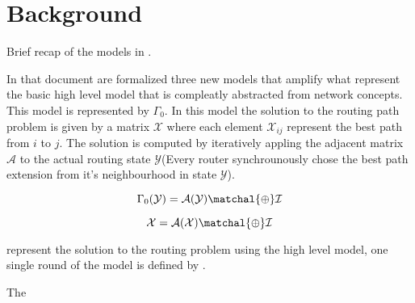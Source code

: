 \documentclass[10pt,conference,letterpaper]{IEEEtran}
\theoremstyle{definition}
\theoremstyle{remark}
\newcommand{\semiringchoice}{\ensuremath{\matchal{\oplus}}\xspace}
\newcommand{\Amatrix}{\ensuremath{\mathcal{A}}\xspace}
\newcommand{\highlevelmodel}{\ensuremath{\Gamma_0}\xspace}
\newcommand{\resultmatrix}{\ensuremath{\mathcal{X}}\xspace}
\newcommand{\currentstatematrix}{\ensuremath{\mathcal{Y}}\xspace}
\newcommand{\Imatrix}{\ensuremath{\mathcal{I}}\xspace}
\begin{document}
\section{Background}
\label{sec:background}

Brief recap of the models in \cite{AgdaHardStateVectoringRouting}.

In that document are formalized three new models that amplify what represent the
basic high level model that is compleatly abstracted from network concepts.
This model is represented by \highlevelmodel.
In this model the solution to the routing path problem is given by a matrix \resultmatrix
where each element $\resultmatrix_{ij}$ represent the best path from $i$ to $j$.
The solution is computed by iteratively appling the adjacent matrix \Amatrix to
the actual routing state \currentstatematrix (Every router synchrounously chose
the best path extension from it's neighbourhood in state \currentstatematrix).

\begin{equation}
	\highlevelmodel ( \currentstatematrix ) = \Amatrix ( \currentstatematrix) \semiringchoice \Imatrix 
	\label{eq:highlevelround}
\end{equation}

\begin{equation}
	\resultmatrix = \Amatrix ( \resultmatrix ) \semiringchoice \Imatrix 
	\label{eq:highlevelsolution}
\end{equation}

 represent the solution to the routing problem using
the high level model, one single round of the model is defined by .

The 



\end{document}
